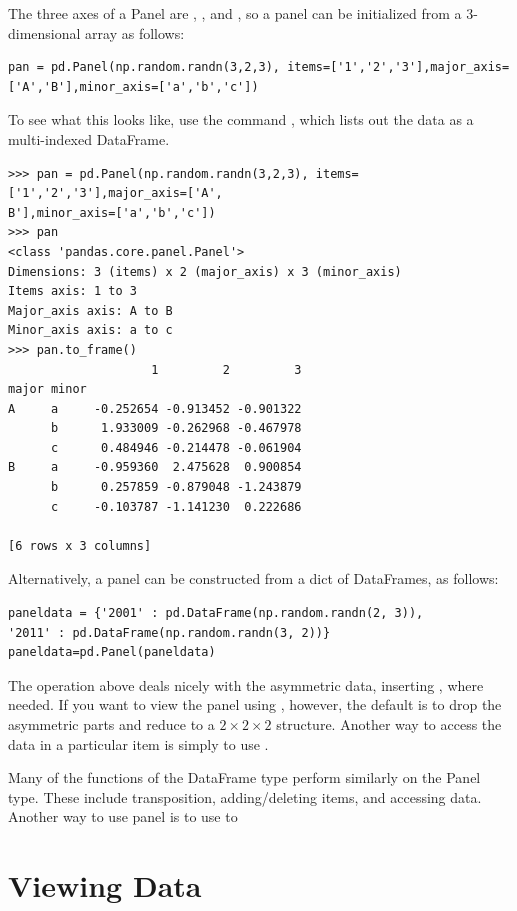 The three axes of a Panel are , , and , so a panel can be initialized from a 3-dimensional array as follows:

\begin{lstlisting}
pan = pd.Panel(np.random.randn(3,2,3), items=['1','2','3'],major_axis=['A','B'],minor_axis=['a','b','c'])
\end{lstlisting}

To see what this looks like, use the command , which lists out the data as a multi-indexed DataFrame.

\begin{lstlisting}
>>> pan = pd.Panel(np.random.randn(3,2,3), items=['1','2','3'],major_axis=['A',
B'],minor_axis=['a','b','c'])
>>> pan
<class 'pandas.core.panel.Panel'>
Dimensions: 3 (items) x 2 (major_axis) x 3 (minor_axis)
Items axis: 1 to 3
Major_axis axis: A to B
Minor_axis axis: a to c
>>> pan.to_frame()
                    1         2         3
major minor
A     a     -0.252654 -0.913452 -0.901322
      b      1.933009 -0.262968 -0.467978
      c      0.484946 -0.214478 -0.061904
B     a     -0.959360  2.475628  0.900854
      b      0.257859 -0.879048 -1.243879
      c     -0.103787 -1.141230  0.222686

[6 rows x 3 columns]
\end{lstlisting}

Alternatively, a panel can be constructed from a dict of DataFrames, as follows:

\begin{lstlisting}
paneldata = {'2001' : pd.DataFrame(np.random.randn(2, 3)),
'2011' : pd.DataFrame(np.random.randn(3, 2))}
paneldata=pd.Panel(paneldata)
\end{lstlisting}

The operation above deals nicely with the asymmetric data, inserting , where needed. If you want to view the panel using , however, the default is to drop the asymmetric parts and reduce to a $2\times 2\times 2$ structure. Another way to access the data in a particular item is simply to use .

Many of the functions of the DataFrame type perform similarly on the Panel type. These include transposition, adding/deleting items, and accessing data. Another way to use panel is to use  to

\section*{Viewing Data}

